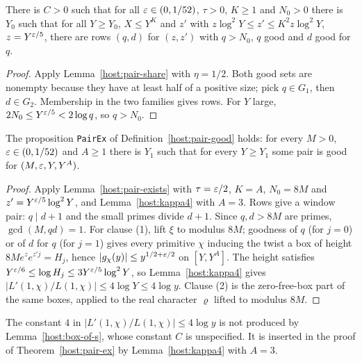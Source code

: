 \begin{lemma}\label{host:pair-exists}
There is $C>0$ such that for all $\varepsilon\in(0,1/52)$, $\tau>0$, $K\ge1$ and
$N_0>0$ there is $Y_0$ such that for all $Y\ge Y_0$, $X\le Y^K$ and $z'$
with $z\log^2Y\le z'\le K^2z\log^2Y$, $z=Y^{\varepsilon/5}$, there are rows $(q,d)$
for $(z,z')$ with $q>N_0$, $q$ good and $d$ good for $q$.
\end{lemma}
\begin{proof}
Apply Lemma~\ref{host:pair-share} with $\eta=1/2$. Both good sets are
nonempty because they have at least half of a positive size; pick $q\in
G_1$, then $d\in G_2$. Membership in the two families gives rows. For $Y$
large, $2N_0\le Y^{\varepsilon/5}<2\log q$, so $q>N_0$.
\end{proof}

\begin{theorem}\label{host:pair-ex}
The proposition \texttt{PairEx} of Definition~\ref{host:pair-good} holds:
for every $M>0$, $\varepsilon\in(0,1/52)$ and $A\ge1$ there is $Y_1$ such that for
every $Y\ge Y_1$ some pair is good for $(M,\varepsilon,Y,Y^A)$.
\end{theorem}
\begin{proof}
Apply Lemma~\ref{host:pair-exists} with $\tau=\varepsilon/2$, $K=A$, $N_0=8M$
and $z'=Y^{\varepsilon/5}\log^2Y$, and Lemma~\ref{host:kappa4} with $A=3$. Rows
give a window pair: $q\mid d+1$ and the small primes divide $d+1$. Since
$q,d>8M$ are primes, $\gcd(M,qd)=1$. For clause (1), lift $\xi$ to modulus
$8M$; goodness of $q$ (for $j=0$) or of $d$ for $q$ (for $j=1$) gives every
primitive $\chi$ inducing the twist a box of height
$8Me^{z}e^{z'j}=H_j$, hence $|g_{\chi}(y)|\le y^{1/2+\varepsilon/2}$ on $[Y,Y^A]$.
The height satisfies $Y^{\varepsilon/6}\le\log H_j\le3Y^{\varepsilon/5}\log^2Y$, so
Lemma~\ref{host:kappa4} gives $|L'(1,\chi)/L(1,\chi)|\le4\log Y\le4\log y$.
Clause (2) is the zero-free-box part of the same boxes, applied to the
real character $\varrho$ lifted to modulus $8M$.
\end{proof}

\begin{remark}\label{host:rem-four}
The constant $4$ in $|L'(1,\chi)/L(1,\chi)|\le4\log y$ is not produced by
Lemma~\ref{host:box-of-s}, whose constant $C$ is unspecified. It is
inserted in the proof of Theorem~\ref{host:pair-ex} by
Lemma~\ref{host:kappa4} with $A=3$.
\end{remark}

